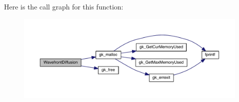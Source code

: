 Here is the call graph for this function\+:\nopagebreak
\begin{figure}[H]
\begin{center}
\leavevmode
\includegraphics[width=350pt]{a00413_a82c7423dfb045f99c1ef26e9fd09976a_cgraph}
\end{center}
\end{figure}
